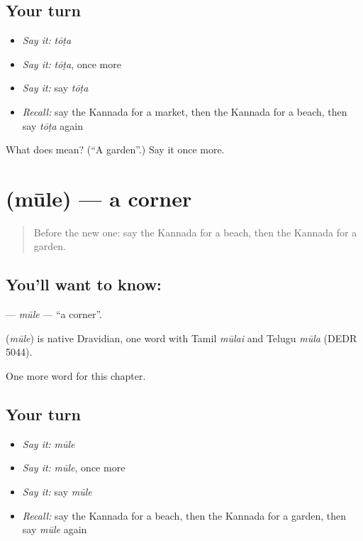\subsection*{Your turn}
\begin{itemize}
\raggedright
  \item \emph{Say it:} \emph{tōṭa}
  \item \emph{Say it:} \emph{tōṭa}, once more
  \item \emph{Say it:} say \emph{tōṭa}
  \item \emph{Recall:} say the Kannada for a market, then the Kannada for a beach, then say \emph{tōṭa} again
\end{itemize}

\begin{tcolorbox}[breakable,colback=teal!4,colframe=teal!35!black,title={Before you move on}]
What does  mean? (\textquotedblleft{}A garden\textquotedblright{}.) Say it once more.
\end{tcolorbox}
\section[\texorpdfstring{\kn{ಮೂಲೆ} (mūle)}{ಮೂಲೆ (mūle)}]{ (mūle) — a corner}

\label{lesson:KA-C110-mule}



\begin{quote}
Before the new one: say the Kannada for a beach, then the Kannada for a garden.
\end{quote}

\subsection*{You'll want to know: }
\textbf{} — \emph{mūle} — \textquotedblleft{}a corner\textquotedblright{}.

\begin{cousinweb}
\textbf{} (\emph{mūle}) is native Dravidian, one word with Tamil \emph{mūlai} and Telugu \emph{mūla} (DEDR 5044).
\end{cousinweb}

\begin{grammarlens}[title={What you've built}]
One more word for this chapter.
\end{grammarlens}

\subsection*{Your turn}
\begin{itemize}
\raggedright
  \item \emph{Say it:} \emph{mūle}
  \item \emph{Say it:} \emph{mūle}, once more
  \item \emph{Say it:} say \emph{mūle}
  \item \emph{Recall:} say the Kannada for a beach, then the Kannada for a garden, then say \emph{mūle} again
\end{itemize}

